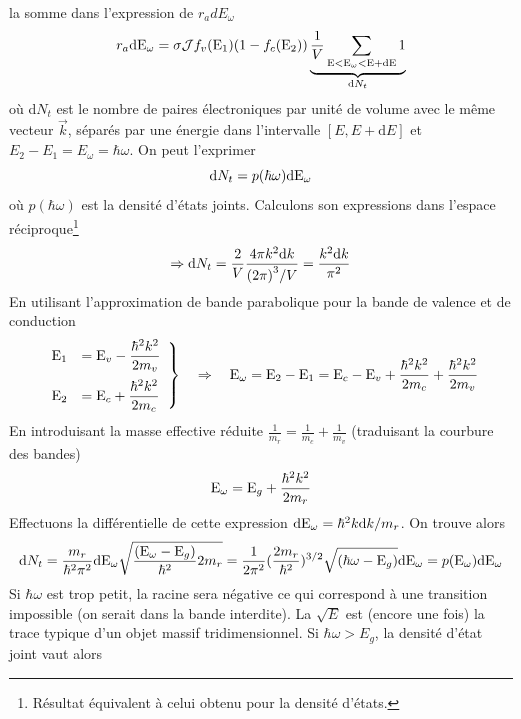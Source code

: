 		la somme dans l'expression de $r_adE_\omega$
		\begin{equation}
		{r_a}{\rm{d}}{{\rm{E}}_\omega } = \sigma {{\cal J}}{f_v}({{\rm{E}}_1})(1 - {f_c}
		({{\rm{E}}_2}))\underbrace{\frac{1}{V}\sum\limits_{{\rm{E < }}{{\rm{E}}_\omega } < {\rm{E +
		dE}}} 1 }_{\text{d}N_t}
		\end{equation}
		où d$N_t$ est le nombre de paires électroniques par unité de volume avec le même vecteur 
		$\vec{k}$, séparés par une énergie dans l'intervalle $[E,E+\text{d}E]$ et $E_2-E_1=E_\omega
		=\hbar\omega$. On peut l'exprimer
		\begin{equation}
		{\rm{d}}{N_t} = p(\hbar \omega ){\rm{d}}{{\rm{E}}_\omega }
		\end{equation}
		où $p(\hbar\omega)$ est la densité d'états joints. Calculons son expressions dans l'espace
		réciproque\footnote{Résultat équivalent à celui obtenu pour la densité d'états.}
		\begin{equation}
		\Rightarrow {\rm{d}}{N_t} = \frac{2}{V}\frac{{4\pi {k^2}{\rm{d}}k}}{{{{(2\pi )}^3}/V}} =
		 \frac{{{k^2}{\rm{d}}k}}{{{\pi ^2}}}
		\end{equation}
		En utilisant l'approximation de bande parabolique pour la bande de valence et de conduction
		\begin{equation}
		\left.\begin{array}{ll}
		\DS{{\rm{E}}_1} &\DS= {{\rm{E}}_v} - \frac{{{\hbar ^2}{k^2}}}{{2{m_v}}}\vspace{2mm}\\
		\DS{{\rm{E}}_2} &\DS= {{\rm{E}}_c} + \frac{{{\hbar ^2}{k^2}}}{{2{m_c}}}
		\end{array}\right\}\quad\Rightarrow\quad {{\rm{E}}_\omega } = {{\rm{E}}_2} -
        {{\rm{E}}_1} = {{\rm{E}}_c} - {{\rm{E}}_v} + \frac{{{\hbar ^2}{k^2}}}{{2{m_c}}} +
		\frac{{{\hbar ^2}{k^2}}}{{2{m_v}}}
		\end{equation}
		En introduisant la masse effective réduite $\frac{1}{{{m_r}}} = \frac{1}{{{m_c}}} + \frac{1}
		{{{m_v}}}$ (traduisant la courbure des bandes)
		\begin{equation}
		{{\rm{E}}_\omega } = {{\rm{E}}_g} + \frac{{{\hbar ^2}{k^2}}}{{2{m_r}}}
		\end{equation}
		Effectuons la différentielle de cette expression ${\rm{d}}{{\rm{E}}_\omega } = {\hbar ^2}
		k{\rm{d}}k/{m_r}$. On trouve alors
		\begin{equation}
		{\rm{d}}{N_t} = \frac{{{m_r}}}{{{\hbar ^2}{\pi ^2}}}{\rm{d}}{{\rm{E}}_\omega }\sqrt {\frac{{({{\rm{E}}_\omega } - {{\rm{E}}_g})}}{{{\hbar ^2}}}2{m_r}}  = \frac{1}{{2{\pi ^2}}}{(\frac{{2{m_r}}}{{{\hbar ^2}}})^{3/2}}\sqrt {(\hbar \omega  - {{\rm{E}}_g})} {\rm{d}}{{\rm{E}}_\omega } = p({{\rm{E}}_\omega }){\rm{d}}{{\rm{E}}_\omega }
		\end{equation}
		Si $\hbar\omega$ est trop petit, la racine sera négative ce qui correspond à une transition 
		impossible (on serait dans la bande interdite). La $\sqrt{E}$ est (encore une fois) la 
		trace typique d'un objet massif tridimensionnel. Si $\hbar\omega>E_g$, la densité 
		d'état joint vaut alors\\
		
